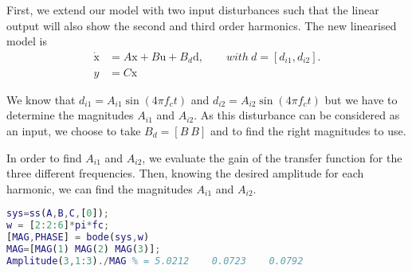 First, we extend our model with two input disturbances such that the linear output will also show the second and third order harmonics. The new linearised model is
\begin{align*}
   \dot{\text{x}} &= A\text{x} + B\text{u} +B_d\text{d}, \qquad with\ d = [d_{i1}, d_{i2}].\\
   y &= C\text{x}
\end{align*}



We know that $d_{i1} = A_{i1}\sin(4\pi f_ct)$ and $d_{i2} = A_{i2}\sin(4\pi f_ct)$ but we have to determine the magnitudes $A_{i1}$ and $A_{i2}$. As this disturbance can be considered as an input, we choose to take $B_d = [B\ B]$ and to find the right magnitudes to use.

In order to find $A_{i1}$ and $A_{i2}$, we evaluate the gain of the transfer function for the three different frequencies. Then, knowing the desired amplitude for each harmonic, we can find the magnitudes $A_{i1}$ and $A_{i2}$.

\begin{lstlisting}[language=Matlab]
sys=ss(A,B,C,[0]);
w = [2:2:6]*pi*fc;
[MAG,PHASE] = bode(sys,w)
MAG=[MAG(1) MAG(2) MAG(3)];
Amplitude(3,1:3)./MAG % = 5.0212    0.0723    0.0792
\end{lstlisting}